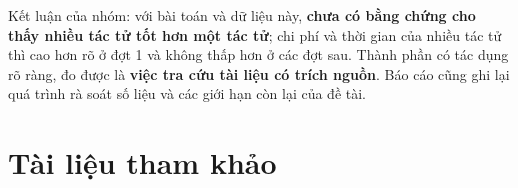 \documentclass[12pt,a4paper,oneside]{report}
\begin{document}
Kết luận của nhóm: với bài toán và dữ liệu này, \textbf{chưa có bằng chứng cho thấy nhiều tác tử tốt hơn một tác tử}; chi phí và thời gian của nhiều tác tử thì cao hơn rõ ở đợt 1 và không thấp hơn ở các đợt sau. Thành phần có tác dụng rõ ràng, đo được là \textbf{việc tra cứu tài liệu có trích nguồn}. Báo cáo cũng ghi lại quá trình rà soát số liệu và các giới hạn còn lại của đề tài.

\tableofcontents

\listoffigures
{}

\listoftables
{}



\clearpage
{}










\chapter*{Tài liệu tham khảo}


\appendix
{}

\end{document}
